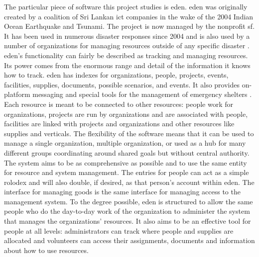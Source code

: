 \documentclass[a4paper,man,natbib,floatsintext]{apa6}
\begin{document}
   The particular piece of software this project studies is \acrfull{eden}. \acrshort{eden} was originally created by a coalition of Sri Lankan \acrfull{ict} companies in the wake of the 2004 Indian Ocean Earthquake and Tsunami. The project is now managed by the nonprofit \gls{sf}. It has been used in numerous disaster responses since 2004 and is also used by a number of organizations for managing resources outside of any specific disaster \citep{Sahana_Foundation_undated-hl}. \acrshort{eden}'s functionality can fairly be described as tracking and managing resources. Its power comes from the enormous range and detail of the information it knows how to track. \acrshort{eden} has indexes for organizations, people, projects, events, facilities, supplies, documents, possible scenarios, and events. It also provides on-platform messaging and special tools for the management of emergency shelters \citep{Sahana_Foundation2011-od}. Each resource is meant to be connected to other resources: people work for organizations, projects are run by organizations and are associated with people, facilities are linked with projects and organizations and other resources like supplies and verticals. The flexibility of the software means that it can be used to manage a single organization, multiple organization, or used as a hub for many different groups coordinating around shared goals but without central authority. The system aims to be as comprehensive as possible and to use the same entity for resource and system management. The entries for people can act as a simple rolodex and will also double, if desired, as that person's account within \acrshort{eden}. The interface for managing goods is the same interface for managing access to the management system. To the degree possible, \acrshort{eden} is structured to allow the same people who do the day-to-day work of the organization to administer the system that manages the organizations' resources. It also aims to be an effective tool for people at all levels: administrators can track where people and supplies are allocated and volunteers can access their assignments, documents and information about how to use resources.
   
\end{document}

